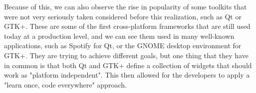 \par
Because of this, we can also observe the rise in popularity of some toolkits that were not very seriously taken considered before this realization, such as Qt or GTK+.
These are some of the first cross-platform frameworks that are still used today at a production level, and we can see them used in many well-known applications, such as Spotify for Qt, or the GNOME desktop environment for GTK+.
They are trying to achieve different goals, but one thing that they have in common is that both Qt and GTK+ define a collection of widgets that should work as "platform independent"\cite{firstDefinition}.
This then allowed for the developers to apply a "learn once, code everywhere" approach.

